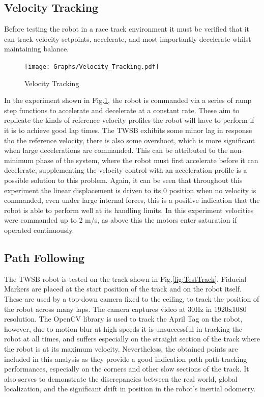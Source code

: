     \subsection{Velocity Tracking}

    Before testing the robot in a race track environment it must be verified that it can track velocity setpoints, accelerate, and most 
    importantly decelerate whilst maintaining balance. 
    \begin{figure}[H]
        \centering
        \texttt{[image: Graphs/Velocity\_Tracking.pdf]}
        \caption{Velocity Tracking}
        \label{fig:VelocityTracking}
    \end{figure}

    In the experiment shown in Fig.\ref{fig:VelocityTracking}, the robot is commanded via a series of 
    ramp step functions to accelerate and decelerate at a constant rate. These aim to replicate the kinds of reference velocity profiles 
    the robot will have to perform if it is to achieve good lap times.
    The TWSB exhibits some minor lag in response tho the reference velocity, there is also some overshoot, which is 
    more significant when large decelerations are commanded. This can be attributed to the non-minimum phase of the system, 
    where the robot must first accelerate before it can decelerate, supplementing the velocity control with an acceleration 
    profile is a possible solution to this problem. Again, it can be seen that throughout this experiment the linear displacement 
    is driven to its 0 position when no velocity is commanded, even under large internal forces, this is a positive indication that the robot is able
    to perform well at its handling limits. In this experiment velocities were commanded up to 2 m/s, as above this the motors enter saturation 
    if operated continuously.

    \subsection{Path Following}
    The TWSB robot is tested on the track shown in Fig.\ref{fig:TestTrack}. Fiducial Markers are placed at the start position of the track and on the robot itself. 
    These are used by a top-down camera fixed to the ceiling, to track the position of the robot across many laps. The camera captures video at 30Hz in 1920x1080 resolution.
    The OpenCV library is used to track the April Tag on the robot, however, due to motion blur at high speeds it is unsuccessful in tracking the robot at all times, and 
    suffers especially on the straight section of the track where the robot is at its maximum velocity. Nevertheless, the obtained points are included in this analysis 
    as they provide a good indication path path-tracking performances, especially on the corners and other slow sections of the track. It also serves to demonstrate the discrepancies 
    between the real world, global localization, and the significant drift in position in the robot's inertial odometry. 

